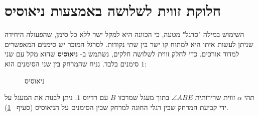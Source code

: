 
\section{חלוקת זווית לשלושה באמצעות ניאוסיס}
\label{s.neusis}

השימוש במילה "סרגל" מטעה, כי הכוונה היא למקל ישר ללא כל סימן, שהפעולה היחידה שניתן לעשות איתו היא למתוח קו ישר בין שתי נקודות. לסרגל המוכר יש סימנים המאפשרים למדוד אורכים. כדי לחלק זווית לשלושה חלקים, נשתמש ב-%
\textbf{ניאוסיס}
שהוא מקל עם שני סימנים בלבד. נניח שהמרחק בין שני הסימנים הוא
$1$:
\begin{figure}[htb]
\begin{center}
\end{center}
\caption{ניאוסיס}\label{f.neusis}
\end{figure}
תהי 
$\alpha$
זווית שרירותית
$\angle ABE$
בתוך מעגל שמרכזו
$B$
עם רדיוס
$1$.
ניתן לבנות את המעגל על ידי קביעת המרחק שבין רגלי החוגה למרחק שבין הסימנים על הניאוסיס (סעיף%
~\ref{f.neusis}). 

